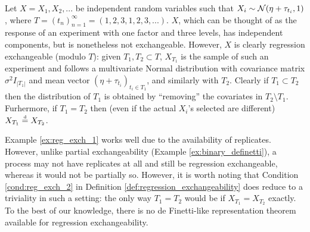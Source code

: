 \begin{mdframed}[backgroundcolor=mygray] 
	\begin{example} \label{ex:reg_exch_1}
		Let $X = X_1, X_2, ...$ be independent random variables such that $X_i \sim \mathcal{N} (\eta + \tau_{t_i}, 1)$, where $T = (t_n)_{n=1}^{\infty} = (1, 2, 3, 1, 2, 3, ...)$. $X$, which can be thought of as the response of an experiment with one factor and three levels, has independent components, but is nonetheless not exchangeable. However, $X$ is clearly regression exchangeable (modulo $T$): given $T_1, T_2 \subset T$, $X_{T_1}$ is the sample of such an experiment and follows a multivariate Normal distribution with covariance matrix $\sigma^2 I_{|T_1|}$ and mean vector $(\eta + \tau_{t_i})_{t_i \in T_1}$, and similarly with $T_2$. Clearly if $T_1 \subset T_2$ then the distribution of $T_1$ is obtained by ``removing'' the covariates in $T_2 \setminus T_1$. Furhermore, if $T_1 = T_2$ then (even if the actual $X_i$'s selected are different) $X_{T_1} \stackrel{\text{\rm\tiny d}}{=} X_{T_2}$.
	\end{example}
\end{mdframed}


Example \ref{ex:reg_exch_1} works well due to the availability of replicates. However, unlike partial exchangeability (Example \ref{ex:binary_definetti}), a process may not have replicates at all and still be regression exchangeable, whereas it would not be partially so. However, it is worth noting that Condition \ref{cond:reg_exch_2} in Definition \ref{def:regression_exchangeability} does reduce to a triviality in such a setting: the only way $T_1 = T_2$ would be if $X_{T_1} = X_{T_2}$ exactly. \\

To the best of our knowledge, there is no de Finetti-like representation theorem available for regression exchangeability.




